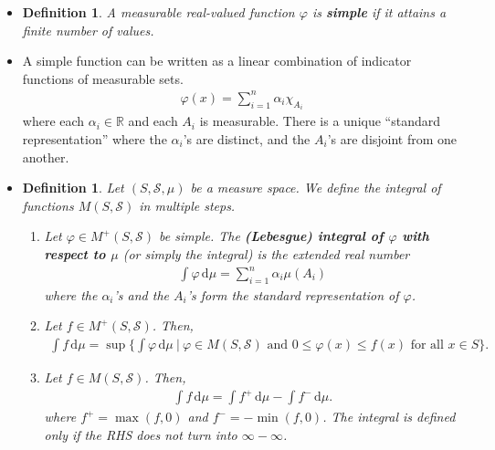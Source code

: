 \documentclass[10pt]{article}
\newtheorem{definition}[lemma]{Definition}
\newcommand{\dee}{\mathrm{d}}
\newcommand{\mcal}[1]{\mathcal{#1}}
\newcommand{\Real}{\mathbb{R}}
\begin{document}
\begin{itemize}
  \item \begin{definition}
    A measurable real-valued function $\varphi$ is {\bf simple} if it attains a finite number of values.
  \end{definition}

  \item A simple function can be written as a linear combination of indicator functions of measurable sets.
  \begin{align*}
    \varphi(x) = \sum_{i=1}^n \alpha_i \chi_{A_i}
  \end{align*}
  where each $\alpha_i \in \Real$ and each $A_i$ is measurable. There is a unique ``standard representation'' where the $\alpha_i$'s are distinct, and the $A_i$'s are disjoint from 
  one another.

  \item \begin{definition} Let $(S,\mcal{S},\mu)$ be a measure space. We define the integral of functions $M(S,\mcal{S})$ in multiple steps.
  \begin{enumerate}
    \item Let $\varphi \in M^+(S,\mcal{S})$ be simple. The {\bf (Lebesgue) integral of $\varphi$ with respect to $\mu$} (or simply the integral) is the extended real number
    \begin{align*}
      \int \varphi\, \dee\mu = \sum_{i=1}^n \alpha_i \mu(A_i)
    \end{align*}
    where the $\alpha_i$'s and the $A_i$'s form the standard representation of $\varphi$.

    \item Let $f \in M^+(S,\mcal{S})$. Then,
    \begin{align*}
      \int f\, \dee\mu = \sup \bigg\{ \int \varphi\, \dee\mu\ \bigg| \  \varphi \in M(S,\mcal{S})\mbox{ and }0 \leq \varphi(x) \leq f(x)\mbox{ for all }x\in S \bigg\}. 
    \end{align*}

    \item Let $f \in M(S,\mcal{S})$. Then,
    \begin{align}
      \int f\, \dee\mu = \int f^+\, \dee\mu - \int f^-\, \dee\mu.
      \label{eqn:integral-definition}
    \end{align}
    where $f^+ = \max(f,0)$ and $f^- = -\min(f,0)$. The integral is defined only if the RHS does not turn into $\infty - \infty$.
  \end{enumerate}  
  \end{definition}


\end{itemize}
\end{document}
